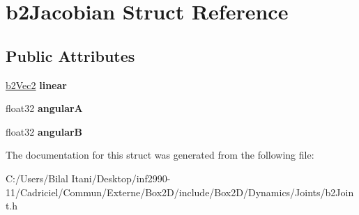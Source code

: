 \hypertarget{structb2_jacobian}{}\section{b2\+Jacobian Struct Reference}
\label{structb2_jacobian}
\subsection*{Public Attributes}
\begin{DoxyCompactItemize}
\item 
\hyperlink{structb2_vec2}{b2\+Vec2} {\bfseries linear}\hypertarget{structb2_jacobian_aa63199b443d411972b9cb6aac6c7cb34}{}\label{structb2_jacobian_aa63199b443d411972b9cb6aac6c7cb34}

\item 
float32 {\bfseries angularA}\hypertarget{structb2_jacobian_a0669f849afcdc154b36f86cb0529d2bc}{}\label{structb2_jacobian_a0669f849afcdc154b36f86cb0529d2bc}

\item 
float32 {\bfseries angularB}\hypertarget{structb2_jacobian_a3bbdbd8e46f4fa9be2e50434edaaeb14}{}\label{structb2_jacobian_a3bbdbd8e46f4fa9be2e50434edaaeb14}

\end{DoxyCompactItemize}


The documentation for this struct was generated from the following file\+:\begin{DoxyCompactItemize}
\item 
C\+:/\+Users/\+Bilal Itani/\+Desktop/inf2990-\/11/\+Cadriciel/\+Commun/\+Externe/\+Box2\+D/include/\+Box2\+D/\+Dynamics/\+Joints/b2\+Joint.\+h\end{DoxyCompactItemize}
